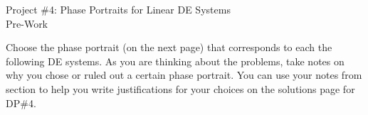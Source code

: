 \documentclass[epsf]{article}
\begin{document}
\newcommand{\R}{\mathbb{R}}
\newcommand{\noi}{\noindent}
\newcommand{\bs}{\bigskip}


\begin{center}
{\Large Project \#4: Phase Portraits for Linear DE Systems\\
\vskip 2mm
Pre-Work}
\end{center}


\noi{\bf PW 1} Choose the phase portrait (on the next page) that corresponds to each the following DE systems.  As you are thinking about the problems, take notes on why you chose or ruled out a certain phase portrait.  You can use your notes from section to help you write justifications for your choices on the solutions page for DP\#4.
\end{document}
